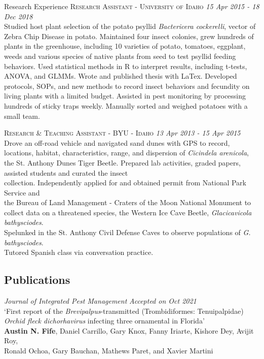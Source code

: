 \documentclass{resume} %
\begin{document}
\begin{rSection}{Research Experience}
\textsc{Research Assistant - University of Idaho} \hfill {\em \textit{ 15 Apr 2015 - 18 Dec 2018}}\\
Studied host plant selection of the potato psyllid \textit{Bactericera cockerelli}, vector of Zebra Chip Disease in potato. Maintained four insect colonies, grew hundreds of plants in the greenhouse, including 10 varieties of potato, tomatoes, eggplant, weeds and various species of native plants from seed to test psyllid feeding behaviors. Used statistical methods in R to interpret results, including t-tests, ANOVA, and GLMMs. Wrote and published thesis with LaTex. Developed protocols, SOPs, and new methods to record insect behaviors and fecundity on living plants with a limited budget. Assisted in pest monitoring by processing hundreds of sticky traps weekly. Manually sorted and weighed potatoes with a small team.\\ \hfill

\textsc{Research \& Teaching Assistant - BYU - Idaho} \hfill {\em \textit{13 Apr 2013 - 15 Apr 2015}}\\
Drove an off-road vehicle and navigated sand dunes with GPS to record, locations, habitat, characteristics, range, and dispersion of \textit{Cicindela arenicola}, the St. Anthony Dunes Tiger Beetle. Prepared lab activities, graded papers, assisted students and curated the insect\\
collection. Independently applied for and obtained permit from National Park Service and\\
the Bureau of Land Management - Craters of the Moon National Monument to collect data on a threatened species, the Western Ice Cave Beetle, \textit{Glacicavicola bathysciodes}.\\
Spelunked in the St. Anthony Civil Defense Caves to observe populations of \textit{G. bathysciodes}.\\
Tutored Spanish class via conversation practice.\\ \hfill


\subsection*{Publications}
\textit{Journal of Integrated Pest Management} \hfill {\em \textit{Accepted on Oct 2021}}\\
`First report of the \textit{Brevipalpus}-transmitted (Trombidiformes: Tenuipalpidae)\\
\textit{Orchid fleck dichorhavirus} infecting three ornamental in Florida'\\
\textbf{Austin N. Fife}, Daniel Carrillo, Gary Knox, Fanny Iriarte, Kishore Dey, Avijit Roy,\\
 Ronald Ochoa, Gary Bauchan, Mathews Paret, and Xavier Martini\\ \hfill
 

\end{rSection}
\end{document}
